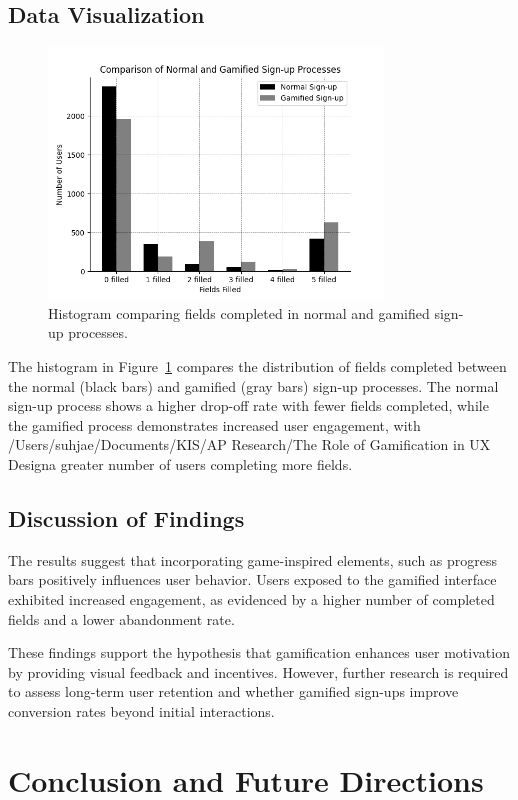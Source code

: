 \documentclass[conference]{IEEEtran}
\begin{document}
\subsection{Data Visualization}
\begin{figure}[!ht]
\centering
\includegraphics[width=3.5in]{media/sign_up_comparison.png}
\caption{Histogram comparing fields completed in normal and gamified sign-up processes.}
\label{fig:sign_up_comparison}
\end{figure}
The histogram in Figure~\ref{fig:sign_up_comparison} compares the distribution of fields completed between the normal (black bars) and gamified (gray bars) sign-up processes. The normal sign-up process shows a higher drop-off rate with fewer fields completed, while the gamified process demonstrates increased user engagement, with /Users/suhjae/Documents/KIS/AP Research/The Role of Gamification in UX Designa greater number of users completing more fields.

\subsection{Discussion of Findings}
The results suggest that incorporating game-inspired elements, such as progress bars positively influences user behavior. Users exposed to the gamified interface exhibited increased engagement, as evidenced by a higher number of completed fields and a lower abandonment rate.

These findings support the hypothesis that gamification enhances user motivation by providing visual feedback and incentives. However, further research is required to assess long-term user retention and whether gamified sign-ups improve conversion rates beyond initial interactions.

\section{Conclusion and Future Directions}
\end{document}
